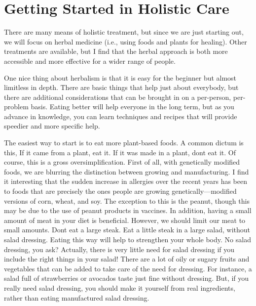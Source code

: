 \section{Getting Started in Holistic Care}

There are many means of holistic treatment,
but since we are just
starting out, we will focus on herbal medicine
(i.e., using foods
and plants for
healing). Other
treatments are available, but I find that the herbal approach is both
more accessible and more effective for a wider
range of people.

One nice thing about herbalism is that it is easy for the beginner but
almost limitless in depth. There are basic things that help just about
everybody, but there are additional considerations that can be brought
in on a per-person, per-problem basis. Eating better will help everyone
in the long term, but as you advance in knowledge, you can learn
techniques and recipes that will provide speedier and more specific
help. 

The easiest way to start is to eat more plant-based foods. A common
dictum is this, {\textquotedbl}If it came from a plant, eat it. If it
was made in a plant, don{\textquotesingle}t eat it.{\textquotedbl}  Of
course, this is a gross oversimplification. First of all, with
genetically modified foods, we are blurring the distinction between
growing and manufacturing. I find it interesting that the sudden
increase in allergies over the recent years has been to foods that are
precisely the ones people are growing genetically—modified versions of
corn, wheat, and soy. The exception to this is the peanut, though
this may be due to the use of peanut products in vaccines. In addition,
having a small amount of meat in your diet is beneficial. However, we
should limit our meat to small amounts. Don{\textquotesingle}t eat a
large steak. Eat a little steak in a large salad, without salad
dressing. Eating this way will help to strengthen your whole body.  No
salad dressing, you ask?  Actually, there is very little need for salad
dressing if you include the right things in your salad!  There are a
lot of oily or sugary fruits and vegetables that can be added to take
care of the need for dressing.  For instance, a salad full of
strawberries or avocados taste just fine without dressing.  But, if you
really need salad dressing, you should make it yourself from real
ingredients, rather than eating manufactured salad dressing.

